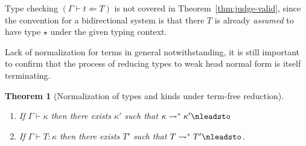 \documentclass{article}
\newcommand{\tpcheck}[0]{\Leftarrow}
\newtheorem{theorem}{Theorem}
\begin{document}
Type checking \((\Gamma \vdash t \tpcheck T)\) is not covered in
Theorem~\ref{thm:judge-valid}, since the convention for a bidirectional system
is that there \(T\) is already \emph{assumed} to have type \(\star\) under the
given typing context.

Lack of normalization for terms in general notwithstanding, it is still
important to confirm that the process of reducing types to weak head normal form
is itself terminating.
\begin{theorem}[Normalization of types and kinds under term-free reduction]
  \label{thm:type-norm}
  \
  \begin{enumerate}
  \item If \(\Gamma \vdash \kappa\) then there exists \(\kappa'\) such that
    \(\kappa \leadsto^* \kappa' \nleadsto\)
   \item If \(\Gamma \vdash T : \kappa\) then there exists \(T'\) such
     that \(T \leadsto^* T' \nleadsto\).
 \end{enumerate}
\end{theorem}
\end{document}

